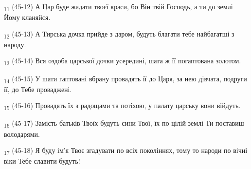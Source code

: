 \begin{tcolorbox}
\textsubscript{11} (45-12) А Цар буде жадати твоєї краси, бо Він твій Господь, а ти до землі Йому кланяйся.
\end{tcolorbox}
\begin{tcolorbox}
\textsubscript{12} (45-13) А Тирська дочка прийде з даром, будуть благати тебе найбагатші з народу.
\end{tcolorbox}
\begin{tcolorbox}
\textsubscript{13} (45-14) Вся оздоба царської дочки усередині, шата ж її погаптована золотом.
\end{tcolorbox}
\begin{tcolorbox}
\textsubscript{14} (45-15) У шати гаптовані вбрану провадять її до Царя, за нею дівчата, подруги її, до Тебе проваджені.
\end{tcolorbox}
\begin{tcolorbox}
\textsubscript{15} (45-16) Провадять їх з радощами та потіхою, у палату царську вони війдуть.
\end{tcolorbox}
\begin{tcolorbox}
\textsubscript{16} (45-17) Замість батьків Твоїх будуть сини Твої, їх по цілій землі Ти поставиш володарями.
\end{tcolorbox}
\begin{tcolorbox}
\textsubscript{17} (45-18) Я буду ім'я Твоє згадувати по всіх поколіннях, тому то народи по вічні віки Тебе славити будуть!
\end{tcolorbox}
